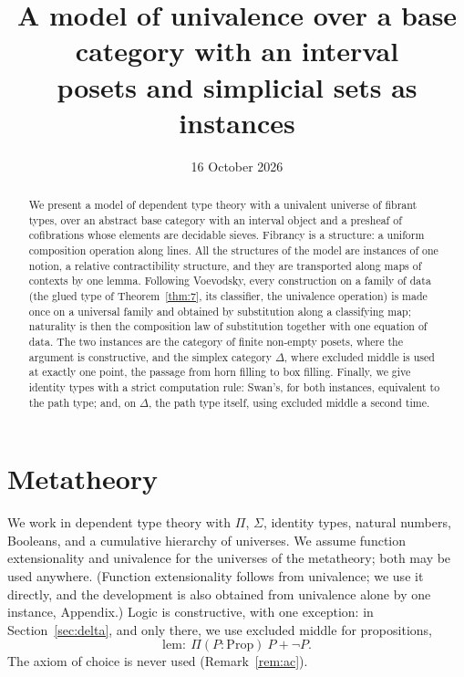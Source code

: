 \documentclass[11pt]{article}
\title{A model of univalence over a base category with an interval\\[3pt]
\large posets and simplicial sets as instances}
\author{}
\date{16 October 2026}
\theoremstyle{plain}
\theoremstyle{definition}
\theoremstyle{remark}
\begin{document}
\maketitle

\begin{abstract}
\noindent
We present a model of dependent type theory with a univalent universe of
fibrant types, over an abstract base category with an interval object and
a presheaf of cofibrations whose elements are decidable sieves. Fibrancy is
a structure: a uniform composition operation along lines. All the
structures of the model are instances of one notion, a relative
contractibility structure, and they are transported along maps of
contexts by one lemma. Following Voevodsky, every construction on a
family of data (the glued type of Theorem~\ref{thm:7}, its classifier, the
univalence operation) is made once on a universal family and obtained by
substitution along a classifying map; naturality is then the composition
law of substitution together with one equation of data. The two instances
are the category of finite non-empty posets, where the argument is
constructive, and the simplex category $\Delta$, where excluded middle is
used at exactly one point, the passage from horn filling to box filling.
Finally, we give identity types with a strict computation rule: Swan's,
for both instances, equivalent to the path type; and, on $\Delta$, the
path type itself, using excluded middle a second time.
\end{abstract}

\tableofcontents

\section{Metatheory}\label{sec:meta}

We work in dependent type theory with $\Pi$, $\Sigma$, identity types,
natural numbers, Booleans, and a cumulative hierarchy of universes. We
assume function extensionality and univalence for the universes of the
metatheory; both may be used anywhere. (Function extensionality follows
from univalence; we use it directly, and the development is also obtained
from univalence alone by one instance, Appendix.) Logic is constructive, with one
exception: in Section~\ref{sec:delta}, and only there, we use excluded
middle for propositions,
\[
\mathrm{lem}:\ \Pi(P:\mathrm{Prop})\ P+\neg P .
\]
The axiom of choice is never used (Remark~\ref{rem:ac}).
\end{document}
